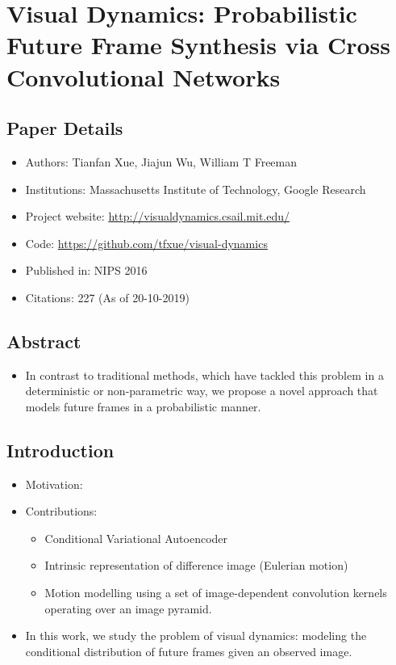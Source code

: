 \documentclass{article}
\begin{document}
    \section{Visual Dynamics: Probabilistic Future Frame Synthesis via Cross Convolutional Networks}\label{sec:Visual_Dynamics_Probabilistic_Future_Frame_Synthesis_via_Cross_Convolutional_Networks}
    \subsection*{Paper Details}
    \begin{itemize}
        \item Authors: Tianfan Xue, Jiajun Wu, William T Freeman
        \item Institutions: Massachusetts Institute of Technology, Google Research
        \item Project website: \url{http://visualdynamics.csail.mit.edu/}
        \item Code: \url{https://github.com/tfxue/visual-dynamics}
        \item Published in: NIPS 2016
        \item Citations: 227 (As of 20-10-2019)
    \end{itemize}

    \subsection*{Abstract}
    \begin{itemize}
        \item In contrast to traditional methods, which have tackled this problem in a deterministic or non-parametric way, we propose a novel approach that models future frames in a probabilistic manner.
    \end{itemize}

    \subsection{Introduction}\label{subsec:Visual_Dynamics_Probabilistic_Future_Frame_Synthesis_via_Cross_Convolutional_Networks:introduction}
    \begin{itemize}
        \item Motivation:
        \item Contributions:
        \begin{itemize}
            \item Conditional Variational Autoencoder
            \item Intrinsic representation of difference image (Eulerian motion)
            \item Motion modelling using a set of image-dependent convolution kernels operating over an image pyramid.
        \end{itemize}
        \item In this work, we study the problem of visual dynamics: modeling the conditional distribution of future frames given an observed image.
    \end{itemize}
\end{document}
